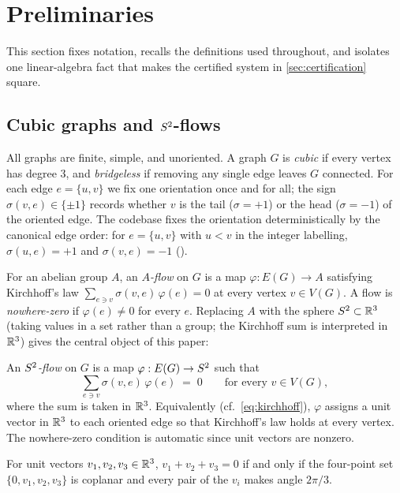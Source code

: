 \section{Preliminaries}
\label{sec:preliminaries}

This section fixes notation, recalls the definitions used throughout,
and isolates one linear-algebra fact that makes the certified system in
\cref{sec:certification} square.

\subsection{Cubic graphs and $S^{2}$-flows}
\label{sec:prelim-flows}

All graphs are finite, simple, and unoriented. A graph $G$ is
\emph{cubic} if every vertex has degree $3$, and \emph{bridgeless} if
removing any single edge leaves $G$ connected. For each edge
$e = \{u,v\}$ we fix one orientation once and for all; the sign
$\sigma(v,e) \in \{\pm 1\}$ records whether $v$ is the tail
($\sigma = +1$) or the head ($\sigma = -1$) of the oriented edge. The
codebase fixes the orientation deterministically by the canonical edge
order: for $e = \{u,v\}$ with $u < v$ in the integer labelling,
$\sigma(u, e) = +1$ and $\sigma(v, e) = -1$
().

For an abelian group $A$, an \emph{$A$-flow} on $G$ is a map
$\varphi : E(G) \to A$ satisfying Kirchhoff's law
$\sum_{e \ni v} \sigma(v,e)\,\varphi(e) = 0$ at every vertex
$v \in V(G)$. A flow is \emph{nowhere-zero} if $\varphi(e) \ne 0$ for
every $e$. Replacing $A$ with the sphere
$S^{2} \subset \mathbb{R}^{3}$ (taking values in a set rather than a group;
the Kirchhoff sum is interpreted in $\mathbb{R}^{3}$) gives the central object
of this paper:

\begin{definition}
\label{def:s2-flow}
An \emph{$S^{2}$-flow} on $G$ is a map $\varphi : E(G) \to S^{2}$
such that
\[
   \sum_{e \ni v} \sigma(v,e)\,\varphi(e) \;=\; 0
   \qquad \text{for every } v \in V(G),
\]
where the sum is taken in $\mathbb{R}^{3}$. Equivalently (cf.\
\cref{eq:kirchhoff}), $\varphi$ assigns a unit vector in $\mathbb{R}^{3}$ to
each oriented edge so that Kirchhoff's law holds at every vertex.
The nowhere-zero condition is automatic since unit vectors are nonzero.
\end{definition}

\begin{lemma}[120-degree triple, after~{\cite[Observation~9]{HMM26}}]
\label{lem:120-degree}
For unit vectors $v_1, v_2, v_3 \in \mathbb{R}^{3}$,
$v_1 + v_2 + v_3 = 0$ if and only if the four-point set
$\{0, v_1, v_2, v_3\}$ is coplanar and every pair of the $v_i$ makes
angle $2\pi/3$.
\end{lemma}


